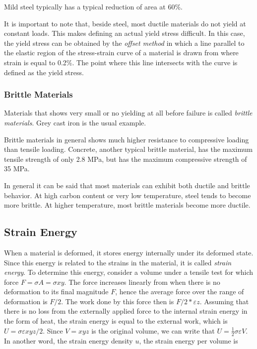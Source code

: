 \documentclass[
10pt,
a4paper,
openany,
svgnames,
]{kaobook} %
\begin{document}
Mild steel typically has a typical reduction of area at 60\%.

It is important to note that, beside steel, most ductile materials do not yield at constant loads. This makes defining an actual yield stress difficult. In this case, the yield stress can be obtained by the \emph{offset method} in which a line parallel to the elastic region of the stress-strain curve of a material is drawn from where strain is equal to 0.2\%. The point where this line intersects with the curve is defined as the yield stress.


\subsubsection{Brittle Materials}

Materials that shows very small or no yielding at all before failure is called \emph{brittle materials}. Grey cast iron is the usual example.

Brittle materials in general shows much higher resistance to compressive loading than tensile loading. Concrete, another typical brittle material, has the maximum tensile strength of only 2.8 MPa, but has the maximum compressive strength of 35 MPa.

In general it can be said that most materials can exhibit both ductile and brittle behavior. At high carbon content or very low temperature, steel tends to become more brittle. At higher temperature, most brittle materials become more ductile.

\subsection{Strain Energy}

When a material is deformed, it stores energy internally under its deformed state. Since this energy is related to the strains in the material, it is called \emph{strain energy}. To determine this energy, consider a volume under a tensile test for which force $F = \sigma A = \sigma xy$. The force increases linearly from when there is no deformation to its final magnitude $F$, hence the average force over the range of deformation is $F/2$. The work done by this force then is $F/2*\varepsilon z$. Assuming that there is no loss from the externally applied force to the internal strain energy in the form of heat, the strain energy is equal to the external work, which is $U = \sigma\varepsilon xyz/2$. Since $V = xyz$ is the original volume, we can write that $U = \frac{1}{2}\sigma\varepsilon V$. In another word, the strain energy density $u$, the strain energy per volume is
\end{document}

